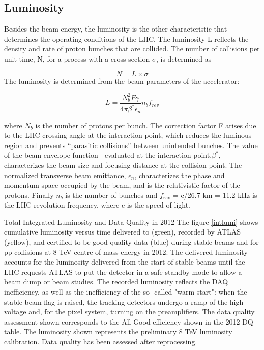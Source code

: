 \subsection{Luminosity}
Besides the beam energy, the luminosity is the other characteristic that determines the
operating conditions of the LHC. The luminosity L reflects the density and rate of proton
bunches that are collided. The number of collisions per unit time, N, for a process with
a cross section $\sigma$, is determined as

\begin{equation} \label{eq:lumi1}
                N = L \times \sigma 
             \end{equation}
The luminosity is determined from the beam parameters of the accelerator:

\begin{equation} \label{eq:lumi2}
          L = \frac{N_{b}^{2} F\gamma}{4 \pi \beta^{*} \epsilon_{n}} n_{b} f_{rev}
             \end{equation}


where $N_{b}$ is the number of protons per bunch. The correction factor F arises due to
the LHC crossing angle at the interaction point, which reduces the luminous region and
prevents ``parasitic collisions'' between unintended bunches. The value of the beam envelope
function  evaluated at the interaction point,$\beta^{*}$, characterizes the beam size and
focusing distance at the collision point. The normalized transverse beam emittance, $\epsilon_{n}$,
characterizes the phase and momentum space occupied by the beam, and  is the relativistic
factor of the protons. Finally $n_{b}$ is the number of bunches and $f_{rev}$ = c/26.7 km
= 11.2 kHz is the LHC revolution frequency, where c is the speed of light.


Total Integrated Luminosity and Data Quality in 2012
The figure \ref{intlumi} shows cumulative luminosity versus time delivered to (green), recorded by ATLAS (yellow), and certified to be good quality data (blue) during stable beams and for pp collisions at 8 TeV centre-of-mass energy in 2012. The delivered luminosity accounts for the luminosity delivered from the start of stable beams until the LHC requests ATLAS to put the detector in a safe standby mode to allow a beam dump or beam studies. The recorded luminosity reflects the DAQ inefficiency, as well as the inefficiency of the so‐ called "warm start": when the stable beam flag is raised, the tracking detectors undergo a ramp of the high-voltage and, for the pixel system, turning on the preamplifiers. The data quality assessment shown corresponds to the All Good efficiency shown in the 2012 DQ table. The luminosity shown represents the preliminary 8 TeV luminosity calibration. Data quality has been assessed after reprocessing. 


